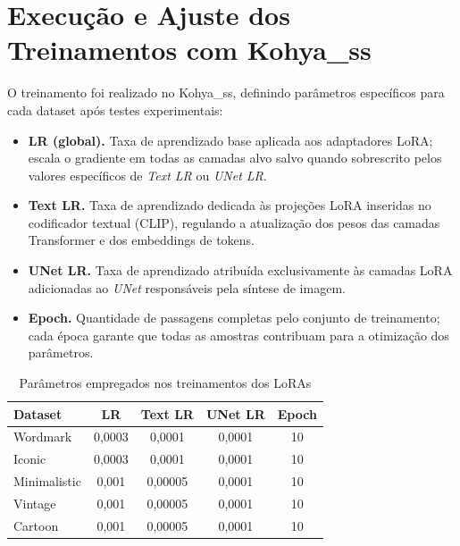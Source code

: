 \documentclass[12pt, %
openright, 
oneside, %
a4paper,    %
brazil]{facom-ufu-abntex2}
\begin{document}
\section{Execução e Ajuste dos Treinamentos com Kohya\_ss}

O treinamento foi realizado no Kohya\_ss, definindo parâmetros específicos para cada dataset após testes experimentais:

\begin{itemize}
    \item \textbf{LR (global).} Taxa de aprendizado base aplicada aos adaptadores LoRA; escala o gradiente em todas as camadas alvo salvo quando sobrescrito pelos valores específicos de \textit{Text LR} ou \textit{UNet LR}.
    \item \textbf{Text LR.} Taxa de aprendizado dedicada às projeções LoRA inseridas no codificador textual (CLIP), regulando a atualização dos pesos das camadas Transformer e dos embeddings de tokens.
    \item \textbf{UNet LR.} Taxa de aprendizado atribuída exclusivamente às camadas LoRA adicionadas ao \textit{UNet} responsáveis pela síntese de imagem.
    \item \textbf{Epoch.} Quantidade de passagens completas pelo conjunto de treinamento; cada época garante que todas as amostras contribuam para a otimização dos parâmetros.
\end{itemize}

\begin{table}[!ht]
    \centering
    \small
    \setlength{\tabcolsep}{4pt}
    \begin{tabularx}{\linewidth}{|X|c|c|c|c|}
    \hline
    \textbf{Dataset} & \textbf{LR} & \textbf{Text LR} & \textbf{UNet LR} & \textbf{Epoch} \\ \hline
    Wordmark               & 0{,}0003 & 0{,}0001 & 0{,}0001 & 10 \\ \hline
    Iconic                 & 0{,}0003 & 0{,}0001 & 0{,}0001 & 10 \\ \hline
    Minimalistic           & 0{,}001  & 0{,}00005 & 0{,}0001 & 10 \\ \hline
    Vintage                & 0{,}001  & 0{,}00005 & 0{,}0001 & 10 \\ \hline
    Cartoon                & 0{,}001  & 0{,}00005 & 0{,}0001 & 10 \\ \hline
    \end{tabularx}
    \caption{Parâmetros empregados nos treinamentos dos LoRAs}
    \label{tab:parametros_lora}
\end{table}
\end{document}
